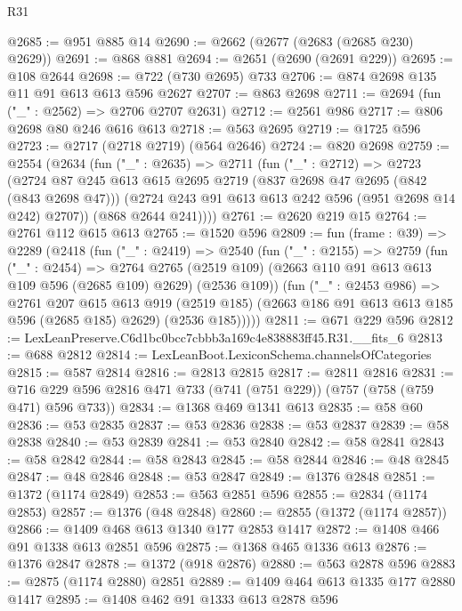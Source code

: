 \begin{lexlean}{R31}
\begin{coremodule}
@2685 := @951 @885 @14
@2690 := @2662 (@2677 (@2683 (@2685 @230) @2629))
@2691 := @868 @881
@2694 := @2651 (@2690 (@2691 @229))
@2695 := @108 @2644
@2698 := @722 (@730 @2695) @733
@2706 := @874 @2698 @135 @11 @91 @613 @613 @596 @2627
@2707 := @863 @2698
@2711 := @2694 (fun ("_" : @2562) => @2706 @2707 @2631)
@2712 := @2561 @986
@2717 := @806 @2698 @80 @246 @616 @613
@2718 := @563 @2695
@2719 := @1725 @596
@2723 := @2717 (@2718 @2719) (@564 @2646)
@2724 := @820 @2698
@2759 := @2554
    (@2634
      (fun ("_" : @2635) =>
      @2711
        (fun ("_" : @2712) =>
        @2723
          (@2724
            @87
            @245
            @613
            @615
            @2695
            @2719
            (@837 @2698 @47 @2695 (@842 (@843 @2698 @47)))
            (@2724 @243 @91 @613 @613 @242 @596 (@951 @2698 @14 @242) @2707))
          (@868 @2644 @241))))
@2761 := @2620 @219 @15
@2764 := @2761 @112 @615 @613
@2765 := @1520 @596
@2809 := fun (frame : @39) =>
  @2289
    (@2418
      (fun ("_" : @2419) =>
      @2540
        (fun ("_" : @2155) =>
        @2759
          (fun ("_" : @2454) =>
          @2764
            @2765
            (@2519 @109)
            (@2663 @110 @91 @613 @613 @109 @596 (@2685 @109) @2629)
            (@2536 @109))
          (fun ("_" : @2453 @986) =>
          @2761
            @207
            @615
            @613
            @919
            (@2519 @185)
            (@2663 @186 @91 @613 @613 @185 @596 (@2685 @185) @2629)
            (@2536 @185)))))
@2811 := @671 @229 @596
@2812 := LexLeanPreserve.C6d1bc0bcc7cbbb3a169c4e838883ff45.R31.__fits_6
@2813 := @688 @2812
@2814 := LexLeanBoot.LexiconSchema.channelsOfCategories
@2815 := @587 @2814
@2816 := @2813 @2815
@2817 := @2811 @2816
@2831 := @716 @229 @596 @2816 @471 @733 (@741 (@751 @229)) (@757 (@758 (@759 @471) @596 @733))
@2834 := @1368 @469 @1341 @613
@2835 := @58 @60
@2836 := @53 @2835
@2837 := @53 @2836
@2838 := @53 @2837
@2839 := @58 @2838
@2840 := @53 @2839
@2841 := @53 @2840
@2842 := @58 @2841
@2843 := @58 @2842
@2844 := @58 @2843
@2845 := @58 @2844
@2846 := @48 @2845
@2847 := @48 @2846
@2848 := @53 @2847
@2849 := @1376 @2848
@2851 := @1372 (@1174 @2849)
@2853 := @563 @2851 @596
@2855 := @2834 (@1174 @2853)
@2857 := @1376 (@48 @2848)
@2860 := @2855 (@1372 (@1174 @2857))
@2866 := @1409 @468 @613 @1340 @177 @2853 @1417
@2872 := @1408 @466 @91 @1338 @613 @2851 @596
@2875 := @1368 @465 @1336 @613
@2876 := @1376 @2847
@2878 := @1372 (@918 @2876)
@2880 := @563 @2878 @596
@2883 := @2875 (@1174 @2880) @2851
@2889 := @1409 @464 @613 @1335 @177 @2880 @1417
@2895 := @1408 @462 @91 @1333 @613 @2878 @596

\end{coremodule}
\end{lexlean}
